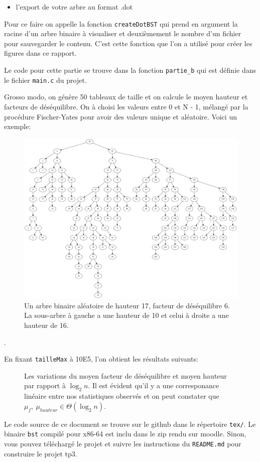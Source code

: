 \documentclass[10pt]{article} %
\begin{document}
\begin{itemize}
    \item [\ding{43}] l'export de votre arbre au format .dot
\end{itemize}

Pour ce faire on appelle la fonction \texttt{createDotBST} qui prend en argument la racine d'un arbre binaire à visualiser et
deuxièmement le nombre d'un fichier pour sauvegarder le contenu. C'est cette fonction que l'on a utilisé pour créer les figures dans
ce rapport.

\vspace{1cm}
\noindent {} 

Le code pour cette partie se trouve dans la fonction \texttt{partie\_b} qui est définie dans le fichier \texttt{main.c} du projet.

Grosso modo, on génère 50 tableaux de taille  et on calcule le moyen hauteur et facteurs de déséquilibre. On à choisi les valeurs entre 0 et N - 1,
mélangé par la procédure Fischer-Yates pour avoir des valeurs unique et aléatoire. Voici un exemple:

\begin{figure}[h!]
    \centering
    \includegraphics[width=.6\textwidth]{media/random.png}
    \caption{Un arbre binaire aléatoire de hauteur 17, facteur de déséquilibre 6. La sous-arbre à gauche a une hauteur de 10 et celui à droite a une hauteur de 16.}
\end{figure}.


\newpage
En fixant \texttt{tailleMax} à 10E5, l'on obtient les résultats suivants:

\begin{figure}[h!]
    \centering
    
    \vspace{-1cm}
    \caption{Les variations du moyen facteur de déséquilibre et moyen hauteur par rapport à $\log_2 n$. Il est évident qu'il y a une corresponance linéaire entre nos statistiques observés et on peut constater que $\mu_f,\ \mu_{hauteur} \in \Theta(\log_2 n)$. }
\end{figure}

\vspace{1cm}
\noindent {}

Le code source de ce document se trouve sur le github dans le répertoire \texttt{tex/}. Le binaire \texttt{bst} compilé pour x86-64 est inclu dans le zip rendu sur moodle. Sinon, vous pouvez téléchargé le projet
et suivre les instructions du \texttt{README.md} pour construire le projet tp3.

\end{document}
